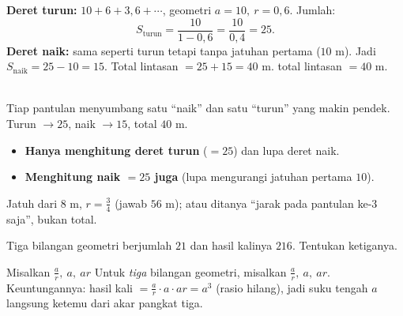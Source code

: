 \jawab
{} \textbf{Deret turun:} $10 + 6 + 3{,}6 + \cdots$, geometri $a=10,\
r=0{,}6$. Jumlah:
\[
S_{\text{turun}}=\frac{10}{1-0{,}6}=\frac{10}{0{,}4}=25.
\]
 \textbf{Deret naik:} sama seperti turun tetapi tanpa jatuhan pertama
($10$ m). Jadi $S_{\text{naik}}=25-10=15$.
 Total lintasan $=25+15=40$ m.
\jadi total lintasan $=40$ m.

\begin{center}
\\
{\small Tiap pantulan menyumbang satu ``naik'' dan satu ``turun'' yang makin
pendek. Turun $\to25$, naik $\to15$, total $40$ m.}
\end{center}

\begin{jebakan}
\begin{itemize}[leftmargin=*,topsep=2pt]
  \item \textbf{Hanya menghitung deret turun} ($=25$) dan lupa deret naik.
  \item \textbf{Menghitung naik $=25$ juga} (lupa mengurangi jatuhan pertama $10$).
\end{itemize}
\end{jebakan}

\begin{variasi}
Jatuh dari $8$ m, $r=\frac34$ (jawab $56$ m); atau ditanya ``jarak pada
pantulan ke-3 saja'', bukan total.
\end{variasi}

\begin{soalbox}{}
Tiga bilangan geometri berjumlah $21$ dan hasil kalinya $216$. Tentukan ketiganya.
\end{soalbox}

\begin{ingat}{Misalkan $\frac ar,\ a,\ ar$}
Untuk \emph{tiga} bilangan geometri, misalkan $\frac ar,\ a,\ ar$. Keuntungannya:
hasil kali $=\frac ar\cdot a\cdot ar = a^3$ (rasio hilang), jadi suku tengah $a$
langsung ketemu dari akar pangkat tiga.
\end{ingat}

